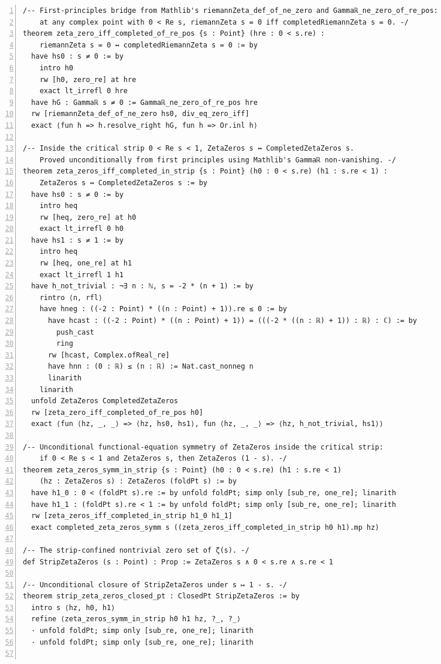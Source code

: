 \documentclass[10pt]{article}
\newcommand{\leansize}{\fontsize{5.5pt}{6.75pt}\selectfont}
\begin{document}
\begin{multicols}{2}
\begin{Verbatim}[numbers=left,firstnumber=1,numbersep=3pt,xleftmargin=2.6em,breaklines=true,breakanywhere=true,breakautoindent=false,breakindent=1.4em,breaksymbolleft={},breakanywheresymbolpre={},fontsize=\leansize]
/-- First-principles bridge from Mathlib's riemannZeta_def_of_ne_zero and Gammaℝ_ne_zero_of_re_pos:
    at any complex point with 0 < Re s, riemannZeta s = 0 iff completedRiemannZeta s = 0. -/
theorem zeta_zero_iff_completed_of_re_pos {s : Point} (hre : 0 < s.re) :
    riemannZeta s = 0 ↔ completedRiemannZeta s = 0 := by
  have hs0 : s ≠ 0 := by
    intro h0
    rw [h0, zero_re] at hre
    exact lt_irrefl 0 hre
  have hG : Gammaℝ s ≠ 0 := Gammaℝ_ne_zero_of_re_pos hre
  rw [riemannZeta_def_of_ne_zero hs0, div_eq_zero_iff]
  exact ⟨fun h => h.resolve_right hG, fun h => Or.inl h⟩

/-- Inside the critical strip 0 < Re s < 1, ZetaZeros s ↔ CompletedZetaZeros s.
    Proved unconditionally from first principles using Mathlib's Gammaℝ non-vanishing. -/
theorem zeta_zeros_iff_completed_in_strip {s : Point} (h0 : 0 < s.re) (h1 : s.re < 1) :
    ZetaZeros s ↔ CompletedZetaZeros s := by
  have hs0 : s ≠ 0 := by
    intro heq
    rw [heq, zero_re] at h0
    exact lt_irrefl 0 h0
  have hs1 : s ≠ 1 := by
    intro heq
    rw [heq, one_re] at h1
    exact lt_irrefl 1 h1
  have h_not_trivial : ¬∃ n : ℕ, s = -2 * (n + 1) := by
    rintro ⟨n, rfl⟩
    have hneg : ((-2 : Point) * ((n : Point) + 1)).re ≤ 0 := by
      have hcast : ((-2 : Point) * ((n : Point) + 1)) = (((-2 * ((n : ℝ) + 1)) : ℝ) : ℂ) := by
        push_cast
        ring
      rw [hcast, Complex.ofReal_re]
      have hnn : (0 : ℝ) ≤ (n : ℝ) := Nat.cast_nonneg n
      linarith
    linarith
  unfold ZetaZeros CompletedZetaZeros
  rw [zeta_zero_iff_completed_of_re_pos h0]
  exact ⟨fun ⟨hz, _, _⟩ => ⟨hz, hs0, hs1⟩, fun ⟨hz, _, _⟩ => ⟨hz, h_not_trivial, hs1⟩⟩

/-- Unconditional functional-equation symmetry of ZetaZeros inside the critical strip:
    if 0 < Re s < 1 and ZetaZeros s, then ZetaZeros (1 - s). -/
theorem zeta_zeros_symm_in_strip {s : Point} (h0 : 0 < s.re) (h1 : s.re < 1)
    (hz : ZetaZeros s) : ZetaZeros (foldPt s) := by
  have h1_0 : 0 < (foldPt s).re := by unfold foldPt; simp only [sub_re, one_re]; linarith
  have h1_1 : (foldPt s).re < 1 := by unfold foldPt; simp only [sub_re, one_re]; linarith
  rw [zeta_zeros_iff_completed_in_strip h1_0 h1_1]
  exact completed_zeta_zeros_symm s ((zeta_zeros_iff_completed_in_strip h0 h1).mp hz)

/-- The strip-confined nontrivial zero set of ζ(s). -/
def StripZetaZeros (s : Point) : Prop := ZetaZeros s ∧ 0 < s.re ∧ s.re < 1

/-- Unconditional closure of StripZetaZeros under s ↦ 1 - s. -/
theorem strip_zeta_zeros_closed_pt : ClosedPt StripZetaZeros := by
  intro s ⟨hz, h0, h1⟩
  refine ⟨zeta_zeros_symm_in_strip h0 h1 hz, ?_, ?_⟩
  · unfold foldPt; simp only [sub_re, one_re]; linarith
  · unfold foldPt; simp only [sub_re, one_re]; linarith


\end{Verbatim}
\end{multicols}
\end{document}
